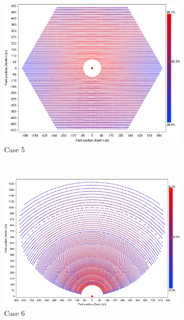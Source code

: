 \documentclass[11pt,letterpaper]{article}
\begin{document}
\begin{figure}
\begin{subfigure}{0.48\linewidth}
	\includegraphics[width=\linewidth]{case-5}
	\caption{Case 5}
	\label{fig:cases-5}
\end{subfigure}~
\begin{subfigure}{0.48\linewidth}
	\includegraphics[width=\linewidth]{case-6}
	\caption{Case 6}
	\label{fig:cases-6}
\end{subfigure}
\caption{}
\label{fig:cases}
\end{figure}
\end{document}
